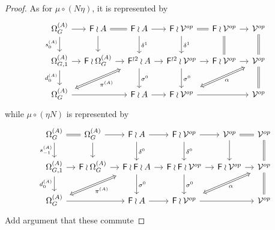 \documentclass[a4paper,10pt]{article}%
\begin{document}
\begin{proof}
As for $\mu \circ (N \eta)$, it is represented by
\begin{equation}\label{UNITSPAN1 EQ}
	\begin{tikzcd}[column sep=1.05em]
	\Omega_G^{(A)} \ar{d}[swap]{s_{0}^{(A)}} \ar{r} &
	\Fin \wr A \ar{d} \ar[equal]{r} &
	\Fin \wr A \ar{d}{\delta^1} \ar{r} &
	\Fin \wr \mathcal{V}^{op} \ar{d}{\delta^1} \ar[equal]{r} &
	\Fin \wr \mathcal{V}^{op} \ar[equal]{d} \ar{r} &
	\mathcal{V}^{op} \ar[equal]{d}
\\
	\Omega_{G,1}^{(A)} \ar{r} \ar{d}[swap]{d_{0}^{(A)}}&
	\Fin \wr \Omega_{G}^{(A)} \ar{r} &
	|[alias=FFOmega]|\Fin^{\wr 2} \wr A \ar{d}{\sigma^0} \ar{r} &
	\Fin^{\wr 2} \wr \mathcal{V}^{op} \ar{d}{\sigma^0} \ar{r} &
	\Fin \wr \mathcal{V}^{op} \ar{r} &
	|[alias=dog]|
	\mathcal{V}^{op} \ar[equal]{d}
\\
	|[alias=Omega]|\Omega_{G}^{(A)} \ar{rr}&&
	\Fin \wr A \ar{r} &
	|[alias=cat]|
	\Fin \wr \mathcal{V}^{op} \ar{rr} &&
	\mathcal{V}^{op}
	\arrow[Leftrightarrow, from=FFOmega, to=Omega,shorten <=0.15cm,,shorten >=0.15cm,"\pi^{(A)}"]
	\arrow[Leftrightarrow, from=dog, to=cat,shorten <=0.15cm,,shorten >=0.15cm,"\alpha"]
	\end{tikzcd}
\end{equation}
while $\mu \circ (\eta N)$ is represented by 
\begin{equation}\label{UNITSPAN2 EQ}
	\begin{tikzcd}[column sep=1.05em]
	\Omega^{(A)}_G \ar{d}[swap]{s_{-1}^{(A)}} \ar[equal]{r} &
	\Omega^{(A)}_G \ar{d} \ar{r} &
	\Fin \wr A \ar{d}{\delta^0} \ar{r} &
	\Fin \wr \mathcal{V}^{op} \ar{d}{\delta^0} \ar{r} &
	\mathcal{V}^{op} \ar{d} \ar[equal]{r} &
	\mathcal{V}^{op} \ar[equal]{d}
\\
	\Omega_{G,1}^{(A)} \ar{r} \ar{d}[swap]{d_{0}^{(A)}}&
	\Fin \wr \Omega_{G}^{(A)} \ar{r} &
	|[alias=FFOmega]|\Fin \wr \Fin \wr A \ar{d}{\sigma^0} \ar{r} &
	\Fin \wr \Fin \wr \mathcal{V}^{op} \ar{d}{\sigma^0} \ar{r} &
	\Fin \wr \mathcal{V}^{op} \ar{r} &
	|[alias=dog]|
	\mathcal{V}^{op} \ar[equal]{d}
\\
	|[alias=Omega]|\Omega_{G}^{(A)} \ar{rr} &&
	\Fin \wr A \ar{r} &
	|[alias=cat]|
	\Fin \wr \mathcal{V}^{op} \ar{rr} &&
	\mathcal{V}^{op}
	\arrow[Leftrightarrow, from=FFOmega, to=Omega,shorten <=0.15cm,,shorten >=0.15cm,"\pi^{(A)}"]
	\arrow[Leftrightarrow, from=dog, to=cat,shorten <=0.15cm,,shorten >=0.15cm,"\alpha"]
	\end{tikzcd}
\end{equation}
{\color{red} Add argument that these commute}
\end{proof}
\end{document}
